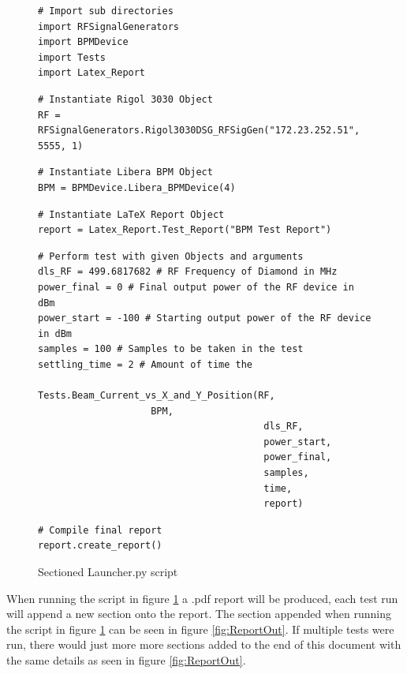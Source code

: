 \documentclass[a4paper, 11pt]{article}
\begin{document}
\begin{figure}[H]
\begin{verbatim}
# Import sub directories
import RFSignalGenerators
import BPMDevice
import Tests
import Latex_Report
\end{verbatim}
\begin{verbatim}
# Instantiate Rigol 3030 Object
RF = RFSignalGenerators.Rigol3030DSG_RFSigGen("172.23.252.51", 5555, 1)
\end{verbatim}
\begin{verbatim}
# Instantiate Libera BPM Object
BPM = BPMDevice.Libera_BPMDevice(4)
\end{verbatim}
\begin{verbatim}
# Instantiate LaTeX Report Object
report = Latex_Report.Test_Report("BPM Test Report")
\end{verbatim}
\begin{verbatim}
# Perform test with given Objects and arguments
dls_RF = 499.6817682 # RF Frequency of Diamond in MHz
power_final = 0 # Final output power of the RF device in dBm
power_start = -100 # Starting output power of the RF device in dBm
samples = 100 # Samples to be taken in the test
settling_time = 2 # Amount of time the 

Tests.Beam_Current_vs_X_and_Y_Position(RF, 
					BPM, 
                                        dls_RF,
                                        power_start, 
                                        power_final, 
                                        samples,
                                        time, 
                                        report)
\end{verbatim}
\begin{verbatim}
# Compile final report 
report.create_report()
\end{verbatim}
\caption{Sectioned Launcher.py script}
\label{fig:SplitLauncher.py}
\end{figure}

When running the script in figure \ref{fig:SplitLauncher.py} a .pdf report will be produced, each test run will append a new section onto the report. The section appended when running the script in figure \ref{fig:SplitLauncher.py} can be seen in figure \ref{fig:ReportOut}. If multiple tests were run, there would just more more sections added to the end of this document with the same details as seen in figure \ref{fig:ReportOut}. 
\end{document}

